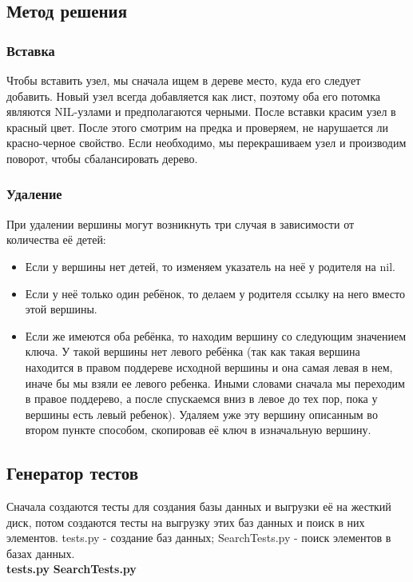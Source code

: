 \documentclass[12pt]{article}
\newcommand{\print}[1]{{\large  \bf  #1} 
{\scriptsize }}
\begin{document}
\subsection*{Метод решения}

\subsubsection*{Вставка}

Чтобы вставить узел, мы сначала ищем в дереве место, куда его следует добавить. Новый узел всегда добавляется как лист, поэтому оба его потомка являются NIL-узлами и предполагаются черными. После вставки красим узел в красный цвет. После этого смотрим на предка и проверяем, не нарушается ли красно-черное свойство. Если необходимо, мы перекрашиваем узел и производим поворот, чтобы сбалансировать дерево.

\subsubsection*{Удаление}

При удалении вершины могут возникнуть три случая в зависимости от количества её детей:
\begin{itemize}
\item Если у вершины нет детей, то изменяем указатель на неё у родителя на nil.
\item Если у неё только один ребёнок, то делаем у родителя ссылку на него вместо этой вершины.
\item Если же имеются оба ребёнка, то находим вершину со следующим значением ключа. У такой вершины нет левого ребёнка (так как такая вершина находится в правом поддереве исходной вершины и она самая левая в нем, иначе бы мы взяли ее левого ребенка. Иными словами сначала мы переходим в правое поддерево, а после спускаемся вниз в левое до тех пор, пока у вершины есть левый ребенок). Удаляем уже эту вершину описанным во втором пункте способом, скопировав её ключ в изначальную вершину.
\end{itemize}

\subsection*{Генератор тестов}
Сначала создаются тесты для создания базы данных и выгрузки её на жесткий диск, потом создаются тесты на выгрузку этих баз данных и поиск в них элементов. tests.py - создание баз данных; SearchTests.py - поиск элементов в базах данных. \\
\print{tests.py}
\print{SearchTests.py}
\end{document}
